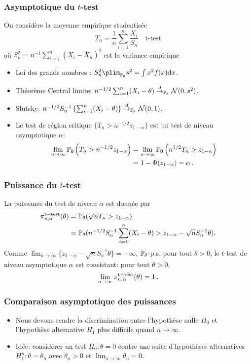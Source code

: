 \begin{frame}
\frametitle{Asymptotique du $t$-test}
On considère la moyenne empirique \alert{studentisée}
\begin{equation*}
T_n= \frac{1}{n} \sum_{i=1}^n \frac{X_i}{S_n} \quad \text{t-test}
\end{equation*}
où $S^2_n= n^{-1} \sum_{i=1}^n (X_i - \bar{X}_n)^2$ est la \alert{variance empirique}
\begin{itemize}
\item Loi des grands nombres : $S^2_n \plim_{\PP_{\theta}} s^2 = \int x^2 f(x) \rmd x$.
\item Théorème Central limite: $n^{-1/2} \sum_{i=1}^n (X_i - \theta) \stackrel{d}{\rightarrow}_{\operatorname{{\mathbb P}}_\theta} \mathcal{N}(0,s^2)$.
\item Slutsky: $n^{-1/2} S_n^{-1} \left\{ \sum_{i=1}^n (X_i-\theta)  \right\} \stackrel{d}{\rightarrow}_{\operatorname{{\mathbb P}}_\theta} \mathcal{N}(0,1)$.
\item Le test de région critique $\{ T_n > n^{-1/2} z_{1-\alpha} \}$ est un test de niveau asymptotique $\alpha$:
\begin{align*}
\lim_{n \to \infty} \operatorname{{\mathbb P}}_0 \left( T_n > n^{-1/2} z_{1-\alpha} \right)
&= \lim_{n \to \infty} \operatorname{{\mathbb P}}_0 \left( n^{1/2} T_n > z_{1-\alpha} \right) \\
&= 1 - \Phi(z_{1-\alpha})= \alpha \,.
\end{align*}
\end{itemize}
\end{frame}


\begin{frame}
\frametitle{Puissance du $t$-test}
La puissance du test de niveau $\alpha$ est donnée par
\begin{align*}
\pi^{\mathrm{t-test}}_{n,\alpha}(\theta)
&= \operatorname{{\mathbb P}}_{\theta}(\sqrt{n} T_n > z_{1-\alpha})\\
&=  \operatorname{{\mathbb P}}_{\theta}(n^{-1/2} S_n^{-1} \sum_{i=1}^n (X_i - \theta) > z_{1-\alpha} - \sqrt{n} S_n^{-1} \theta).
\end{align*}
Comme $\lim_{n \to \infty} \{ z_{1-\alpha} - \sqrt{n} S_n^{-1} \theta\} = -
\infty$, $\operatorname{{\mathbb P}}_\theta$-p.s. pour tout $\theta >0$, le $t$-test de niveau
asymptotique $\alpha$ est \alert{consistant}: pour tout $\theta > 0$, \alert{
\[
\lim_{n \to \infty} \pi^{\mathrm{t-test}}_{n,\alpha}(\theta) = 1 \,.
\]
}
\end{frame}

\begin{frame}
\frametitle{Comparaison asymptotique des puissances}
\begin{itemize}
\item Nous devons rendre la discrimination entre l'hypothèse nulle $H_0$ et l'hypothèse alternative $H_1$ plus \alert{difficile} quand $n \to \infty$.
\item \alert{Idée: }  considérer un test $H_0: \theta = 0$ contre \alert{une suite d'hypothèses alternatives} $H^n_1: \theta = \theta_n$ avec $\theta_n > 0$ et $\lim_{n \to \infty} \theta_n = 0$.
\end{itemize}
\end{frame}

